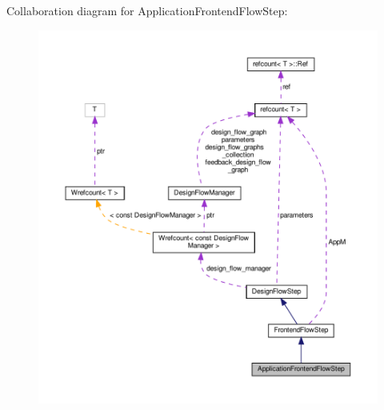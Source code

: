 Collaboration diagram for Application\+Frontend\+Flow\+Step\+:
\nopagebreak
\begin{figure}[H]
\begin{center}
\leavevmode
\includegraphics[width=350pt]{d2/d38/classApplicationFrontendFlowStep__coll__graph}
\end{center}
\end{figure}
